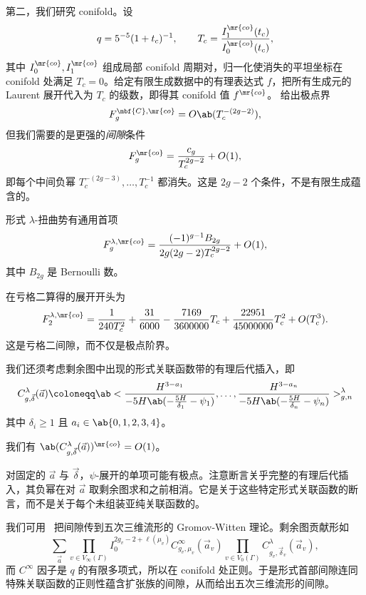 第二，我们研究 conifold。设
\[ q = 5^{-5}(1+t_c)^{-1}, \qquad T_c = \frac{I_1^{\mr{co}}(t_c)}{I_0^{\mr{co}}(t_c)}, \]
其中 \(I_0^{\mr{co}}, I_1^{\mr{co}}\) 组成局部 conifold 周期对，归一化使消失的平坦坐标在 conifold 处满足 \(T_c = 0\)。给定有限生成数据中的有理表达式 \(f\)，把所有生成元的 Laurent 展开代入为 \(T_c\) 的级数，即得其 conifold 值 \(f^{\mr{co}}\)。 给出极点界
\[ F_g^{\mbf{C},\mr{co}} = O\ab(T_c^{-(2g-2)}), \]
但我们需要的是更强的\textit{间隙}条件
\[ F_g^{\mr{co}} = \frac{c_g}{T_c^{2g-2}} + O(1), \]
即每个中间负幂 \(T_c^{-(2g-3)}, \ldots, T_c^{-1}\) 都消失。这是 \(2g-2\) 个条件，不是有限生成蕴含的。

\begin{conj}%
\label{conj:formal conifold gap}
    形式 \(\lambda\)-扭曲势有通用首项
    \[ F_g^{\lambda,\mr{co}} = \frac{(-1)^{g-1}B_{2g}}{2g(2g-2)T_c^{2g-2}} + O(1), \]
    其中 \(B_{2g}\) 是 Bernoulli 数。
\end{conj}

\begin{exm}
    在亏格二算得的展开开头为
    \[ F_2^{\lambda,\mr{co}} = \frac{1}{240T_c^2} + \frac{31}{6000} - \frac{7169}{3600000}T_c + \frac{22951}{45000000}T_c^2 + O(T_c^3). \]
    这是亏格二间隙，而不仅是极点阶界。
\end{exm}

我们还须考虑剩余图中出现的形式关联函数带的有理后代插入，即
\[ C^{\lambda}_{g,\vec{\delta}}(\vec{a}) \coloneqq \ab< \frac{H^{3-a_1}}{-5H\ab(-\frac{5H}{\delta_1}-\psi_1)}, \ldots, \frac{H^{3-a_n}}{-5H\ab(-\frac{5H}{\delta_n}-\psi_n)}>^{\lambda}_{g,n} \]
其中 \(\delta_i \geq 1\) 且 \(a_i \in \ab\{0,1,2,3,4\}\)。

\begin{conj}%
\label{conj:special correlator regularity}
    我们有 \(\ab(C^{\lambda}_{g,\vec{\delta}}(\vec{a}))^{\mr{co}} = O(1)\)。
\end{conj}

对固定的 \(\vec{a}\) 与 \(\vec{\delta}\)，\(\psi\)-展开的单项可能有极点。注意断言关乎完整的有理后代插入，其负幂在对 \(\vec{a}\) 取剩余图求和之前相消。它是关于这些特定形式关联函数的断言，而不是关于每个未组装亚纯关联函数的。

我们可用~ 把间隙传到五次三维流形的 Gromov-Witten 理论。剩余图贡献形如
\[ \sum_{\vec{a}} \prod_{v \in V_{\infty}(\Gamma)}I_0^{2g_v-2+\ell(\mu_v)}C^{\infty}_{g_v,\mu_v}(\vec{a}_v)\prod_{v\in V_0(\Gamma)}C^{\lambda}_{g_v,\vec{\delta}_v}(\vec{a}_v), \]
而 \(C^{\infty}\) 因子是 \(q\) 的有限多项式，所以在 conifold 处正则。于是形式首部间隙连同特殊关联函数的正则性蕴含扩张族的间隙，从而给出五次三维流形的间隙。

